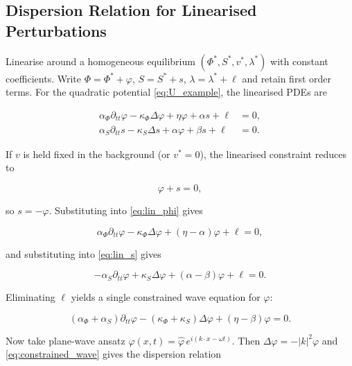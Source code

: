 \documentclass[12pt,a4paper]{article}
\theoremstyle{definition}
\begin{document}
\subsection{Dispersion Relation for Linearised Perturbations}
\label{subsec:rsvp_dispersion}

Linearise around a homogeneous equilibrium
$(\Phi^*,S^*,v^*,\lambda^*)$ with constant coefficients.  Write
$\Phi=\Phi^*+\varphi$, $S=S^*+s$, $\lambda=\lambda^*+\ell$ and retain first
order terms.  For the quadratic potential \eqref{eq:U_example}, the linearised
PDEs are

\begin{align}
  \alpha_\Phi \partial_{tt}\varphi
  - \kappa_\Phi \Delta \varphi
  + \eta \varphi + \alpha s
  + \ell
  &= 0,
  \label{eq:lin_phi}
  \\
  \alpha_S \partial_{tt}s
  - \kappa_S \Delta s
  + \alpha \varphi + \beta s
  + \ell
  &= 0.
  \label{eq:lin_s}
\end{align}

If $v$ is held fixed in the background (or $v^*=0$), the linearised constraint
reduces to

\begin{equation}
  \varphi + s = 0,
  \label{eq:lin_constraint}
\end{equation}

so $s=-\varphi$.  Substituting into \eqref{eq:lin_phi} gives

\begin{equation}
  \alpha_\Phi \partial_{tt}\varphi
  - \kappa_\Phi \Delta \varphi
  + (\eta - \alpha)\varphi
  + \ell
  = 0,
\end{equation}

and substituting into \eqref{eq:lin_s} gives

\begin{equation}
  -\alpha_S \partial_{tt}\varphi
  + \kappa_S \Delta \varphi
  + (\alpha-\beta)\varphi
  + \ell
  = 0.
\end{equation}

Eliminating $\ell$ yields a single constrained wave equation for $\varphi$:

\begin{equation}
  (\alpha_\Phi+\alpha_S)\partial_{tt}\varphi
  - (\kappa_\Phi+\kappa_S)\Delta \varphi
  + (\eta-\beta)\varphi
  = 0.
  \label{eq:constrained_wave}
\end{equation}

Now take plane-wave ansatz $\varphi(x,t)=\hat{\varphi}\,e^{i(k\cdot x-\omega t)}$.
Then $\Delta \varphi = -|k|^2\varphi$ and \eqref{eq:constrained_wave} gives the
dispersion relation
\end{document}
